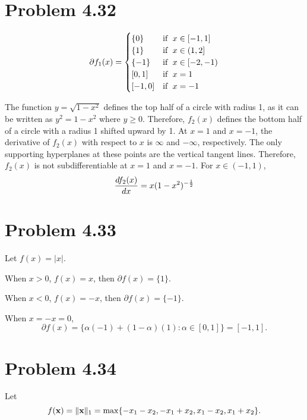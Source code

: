 \documentclass{scrartcl}
\begin{document}
\section*{Problem 4.32}

\begin{equation}
	\partial f_1(x) =
	\begin{cases}
		\{0\} & \text{if \;} x \in [-1,1] \\
		\{1\} & \text{if \;} x \in (1, 2] \\
		\{-1\} & \text{if \;} x \in [-2,-1) \\
		[0, 1] & \text{if \;} x = 1 \\
		[-1, 0] & \text{if \;} x= -1
	\end{cases}
\end{equation}

The function $y = \sqrt{1-x^2}$ defines the top half of a circle with radius 1, as it can be written
as $y^2 = 1-x^2$ where $y \ge 0$. Therefore, $f_2(x)$ defines the bottom half of a circle with a radius
1 shifted upward by 1. At $x = 1$ and $x = -1$, the derivative of $f_2(x)$ with respect to $x$ is
$\infty$ and $-\infty$, respectively. The only supporting hyperplanes at these points are the vertical
tangent lines. Therefore, $f_2(x)$ is not subdifferentiable at $x=1$ and $x=-1$.
For $x \in (-1,1)$,
\begin{equation}
	{d f_2(x) \over dx} = x(1-x^2)^{-{1 \over 2}}	
\end{equation}


\section*{Problem 4.33}

Let $f(x) = |x|$.

When $x > 0$, $f(x) = x$, then $\partial f(x) = \{1\}$.

When $x < 0$, $f(x) = -x$, then $\partial f(x) = \{-1\}$.

When $x = -x = 0$,
\begin{equation}
\partial f(x) = \{\alpha (-1) + (1-\alpha) (1) : \alpha \in [0, 1] \} =  [-1, 1].
\end{equation}

\section*{Problem 4.34}

Let
\begin{equation}
f(\mathbf{x}) = \| \mathbf{x} \|_1 = \max \{-x_1-x_2, -x_1+x_2, x_1-x_2, x_1+x_2\}.
\end{equation}
\end{document}

